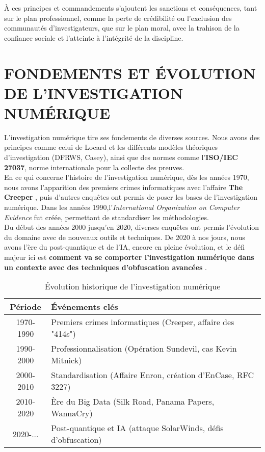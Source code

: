 \documentclass[12pt,a4paper]{article}
\begin{document}
	\vspace{0.5cm}
	À ces principes et commandements s'ajoutent les sanctions et conséquences, tant sur le plan professionnel, comme la perte de crédibilité ou l'exclusion des communautés d'investigateurs, que sur le plan moral, avec la trahison de la confiance sociale et l'atteinte à l'intégrité de la discipline.
	
	\newpage
	\section{FONDEMENTS ET ÉVOLUTION DE L'INVESTIGATION NUMÉRIQUE} 
	L'investigation numérique tire ses fondements de diverses sources. Nous avons des principes comme celui de Locard et les différents modèles théoriques d'investigation (DFRWS, Casey), ainsi que des normes comme l'\textbf{ISO/IEC 27037}, norme internationale pour la collecte des preuves. \\
	En ce qui concerne l'histoire de l'investigation numérique, dès les années 1970, nous avons l'apparition des premiers crimes informatiques avec l'affaire \textbf{\og The Creeper \fg}, puis d'autres enquêtes ont permis de poser les bases de l'investigation numérique. Dans les années 1990,l'\emph{International Organization on Computer Evidence} fut créée, permettant de standardiser les méthodologies. \\
	Du début des années 2000 jusqu'en 2020, diverses enquêtes ont permis l'évolution du domaine avec de nouveaux outils et techniques. De 2020 à nos jours, nous avons l'ère du post-quantique et de l'IA, encore en pleine évolution, et le défi majeur ici est \og \textbf{comment va se comporter l'investigation numérique dans un contexte avec des techniques d'obfuscation avancées} \fg.
	\begin{table}[h!]
		\centering
		\begin{tabularx}{\linewidth}{|c|X|}
			\hline
			\textbf{Période} & \textbf{Événements clés} \\
			\hline
			1970-1990 & Premiers crimes informatiques (Creeper, affaire des "414s") \\
			\hline
			1990-2000 & Professionnalisation (Opération Sundevil, cas Kevin Mitnick) \\
			\hline
			2000-2010 & Standardisation (Affaire Enron, création d’EnCase, RFC 3227) \\
			\hline
			2010-2020 & Ère du Big Data (Silk Road, Panama Papers, WannaCry) \\
			\hline
			2020-... & Post-quantique et IA (attaque SolarWinds, défis d’obfuscation) \\
			\hline
		\end{tabularx}
		\caption{Évolution historique de l’investigation numérique}
	\end{table}
	
\end{document}
